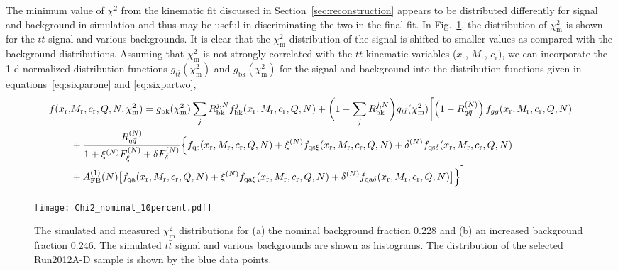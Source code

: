 \documentclass{cmspaperpdf}
\begin{document}
The minimum value of $\chi^2$ from the kinematic fit discussed in Section~\ref{sec:reconstruction} appears to be distributed differently for signal and background in simulation and thus may be useful in discriminating the two in the final fit.  In Fig.~\ref{fig:chisquare}, the distribution of $\chi^2_\mathrm{m}$ is shown for the $t\bar t$ signal and various backgrounds.  It is clear that the $\chi^2_\mathrm{m}$ distribution of the signal is shifted to smaller values as compared with the background distributions.  Assuming that $\chi^2_\mathrm{m}$ is not strongly correlated with the $t\bar t$ kinematic variables ($x_\mathrm{r}$, $M_\mathrm{r}$, $c_\mathrm{r}$), we can incorporate the 1-d normalized distribution functions $g_{t\bar t}(\chi^2_\mathrm{m})$ and  $g_\mathrm{bk}(\chi^2_\mathrm{m})$ for the signal and background into the distribution functions given in equations~\ref{eq:sixparone} and \ref{eq:sixpartwo},
\begin{align}
f(x_\mathrm{r},&M_\mathrm{r},c_\mathrm{r},Q,N,\chi^2_\mathrm{m}) = g_\mathrm{bk}(\chi^2_\mathrm{m})\sum_jR^{j,N}_\mathrm{bk}f^j_\mathrm{bk}(x_\mathrm{r},M_\mathrm{r},c_\mathrm{r},Q,N)
+\biggl(1-\sum_jR^{j,N}_\mathrm{bk}\biggr )g_{t\bar t}(\chi^2_\mathrm{m})\biggl[\left(1-R^{(N)}_{q\bar q}\right) f_{gg}(x_\mathrm{r},M_\mathrm{r},c_\mathrm{r},Q,N)  \nonumber \\
&+\frac{R^{(N)}_{q\bar q}}{1+\xi^{(N)} F^{(N)}_{\xi}+\delta F^{(N)}_{\delta}}\Bigl\lbrace f_\mathrm{qs}(x_\mathrm{r}, M_\mathrm{r}, c_\mathrm{r},Q,N)
+\xi^{(N)} f_{\mathrm{qs}\xi}(x_\mathrm{r}, M_\mathrm{r}, c_\mathrm{r},Q,N)+\delta^{(N)} f_{\mathrm{qs}\delta}(x_\mathrm{r}, M_\mathrm{r}, c_\mathrm{r},Q,N) \nonumber \\
&+A_\mathrm{FB}^{(1)}(N)\bigl[f_\mathrm{qa}(x_\mathrm{r}, M_\mathrm{r}, c_\mathrm{r},Q,N)+\xi^{(N)} f_{\mathrm{qa}\xi}(x_\mathrm{r}, M_\mathrm{r}, c_\mathrm{r},Q,N)+\delta^{(N)} f_{\mathrm{qa}\delta}(x_\mathrm{r}, M_\mathrm{r}, c_\mathrm{r},Q,N)\bigr]\Bigr\rbrace\biggr]   \label{eq:sixparthree}
\end{align}
 
 \begin{figure}[hbt]
  \begin{center}
    \texttt{[image: Chi2\_nominal\_10percent.pdf]}
  \caption{\small The simulated and measured $\chi^2_\mathrm{m}$ distributions for (a) the nominal background fraction 0.228 and (b) an increased background fraction 0.246.  The simulated $t\bar t$ signal and various backgrounds are shown as histograms.  The distribution of the selected Run2012A-D sample is shown by the blue data points.}
    \label{fig:chisquare}
  \end{center}
\end{figure}
\end{document}
